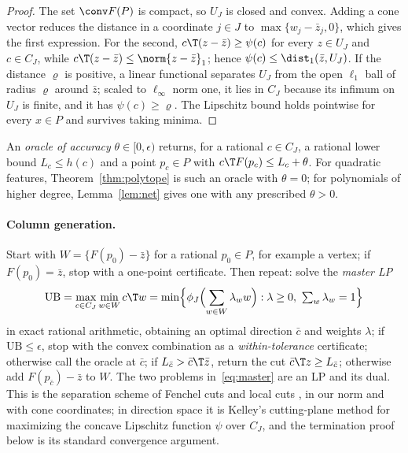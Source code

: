 \begin{proof}
The set $\conv F(P)$ is compact, so $U_J$ is closed and convex. Adding a cone
vector reduces the distance in a coordinate $j\in J$ to $\max\{w_j-\bar z_j,0\}$,
which gives the first expression. For the second, $c\T(z-\bar z)\ge\psi(c)$ for
every $z\in U_J$ and $c\in C_J$, while $c\T(z-\bar z)\le\norm{z-\bar z}_1$; hence
$\psi(c)\le\dist_1(\bar z,U_J)$. If the distance $\varrho$ is positive, a linear
functional separates $U_J$ from the open $\ell_1$ ball of radius $\varrho$ around
$\bar z$; scaled to $\ell_\infty$ norm one, it lies in $C_J$ because its infimum
on $U_J$ is finite, and it has $\psi(c)\ge\varrho$. The Lipschitz bound holds
pointwise for every $x\in P$ and survives taking minima.
\end{proof}

An \emph{oracle of accuracy} $\theta\in[0,\epsilon)$ returns, for a rational
$c\in C_J$, a rational lower bound $L_c\le h(c)$ and a point $p_c\in P$ with
$c\T F(p_c)\le L_c+\theta$. For quadratic features, Theorem~\ref{thm:polytope} is
such an oracle with $\theta=0$; for polynomials of higher degree,
Lemma~\ref{lem:net} gives one with any prescribed $\theta>0$.

\paragraph{Column generation.}
Start with $W=\{F(p_0)-\bar z\}$ for a rational $p_0\in P$, for example a vertex;
if $F(p_0)=\bar z$, stop with a one-point certificate. Then repeat: solve the
\emph{master LP}
\begin{equation}\label{eq:master}
\mathrm{UB}=\max_{c\in C_J}\min_{w\in W}c\T w
=\min\Bigl\{\phi_J\Bigl(\sum_{w\in W}\lambda_ww\Bigr):\lambda\ge0,\ \textstyle\sum_w\lambda_w=1\Bigr\}
\end{equation}
in exact rational arithmetic, obtaining an optimal direction $\bar c$ and
weights $\lambda$; if $\mathrm{UB}\le\epsilon$, stop with the convex combination as
a \emph{within-tolerance} certificate; otherwise call the oracle at $\bar c$; if
$L_{\bar c}>\bar c\T\bar z$, return the cut $\bar c\T z\ge L_{\bar c}$; otherwise add
$F(p_{\bar c})-\bar z$ to $W$. The two problems in~\eqref{eq:master} are an LP
and its dual. This is the separation scheme of Fenchel cuts and local cuts
\citep{Boyd1994,ChvatalCookEspinoza2013}, in our norm and with cone
coordinates; in direction space it is Kelley's cutting-plane method
\citep{CheneyGoldstein1959,Kelley1960} for maximizing the concave Lipschitz
function $\psi$ over $C_J$, and the termination proof below is its standard
convergence argument.

